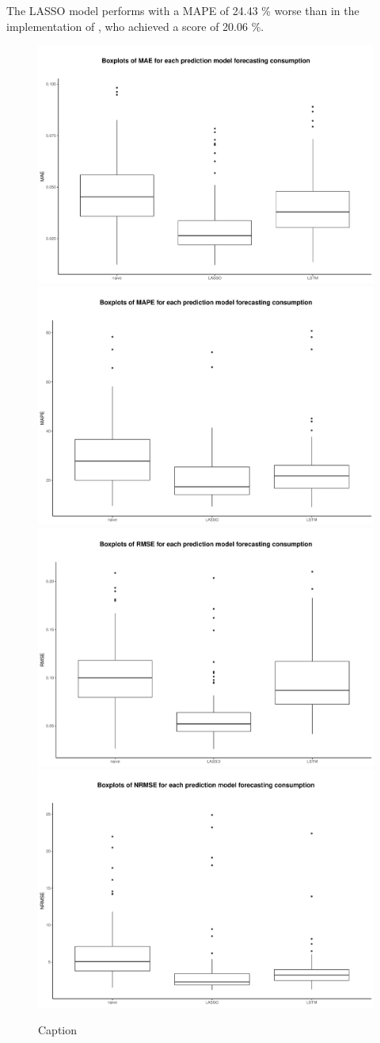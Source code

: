 The LASSO model performs with a MAPE of 24.43 \% worse than in the implementation of \citet{Li:2017}, who achieved a score of 20.06 \%.
%
\begin{figure}
    \centering
    \includegraphics[width=.5\textwidth-0.15em]{thesis/graphs/evaluation/c_boxplot_MAE.pdf}
    \includegraphics[width=.5\textwidth-0.15em]{thesis/graphs/evaluation/c_boxplot_MAPE.pdf} \\
    
    \includegraphics[width=.5\textwidth-0.15em]{thesis/graphs/evaluation/c_boxplot_RMSE.pdf}
    \includegraphics[width=.5\textwidth-0.15em]{thesis/graphs/evaluation/c_boxplot_NRMSE.pdf} \\
    \caption{Caption}
    \label{fig:my_label}
\end{figure}


